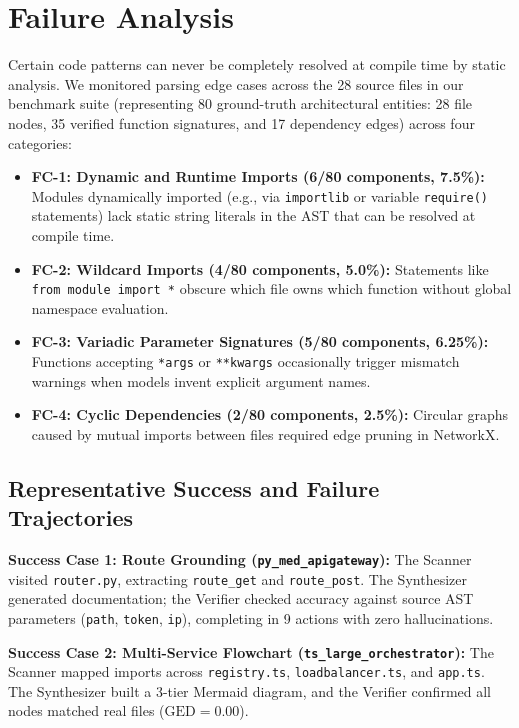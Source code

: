 \documentclass[conference]{IEEEtran}
\begin{document}
\section{Failure Analysis}
Certain code patterns can never be completely resolved at compile time by static analysis. We monitored parsing edge cases across the 28 source files in our benchmark suite (representing 80 ground-truth architectural entities: 28 file nodes, 35 verified function signatures, and 17 dependency edges) across four categories:
\begin{itemize}
    \item \textbf{FC-1: Dynamic and Runtime Imports (6/80 components, 7.5\%):} Modules dynamically imported (e.g., via \texttt{importlib} or variable \texttt{require()} statements) lack static string literals in the AST that can be resolved at compile time.
    \item \textbf{FC-2: Wildcard Imports (4/80 components, 5.0\%):} Statements like \texttt{from module import *} obscure which file owns which function without global namespace evaluation.
    \item \textbf{FC-3: Variadic Parameter Signatures (5/80 components, 6.25\%):} Functions accepting \texttt{*args} or \texttt{**kwargs} occasionally trigger mismatch warnings when models invent explicit argument names.
    \item \textbf{FC-4: Cyclic Dependencies (2/80 components, 2.5\%):} Circular graphs caused by mutual imports between files required edge pruning in NetworkX.
\end{itemize}

\subsection{Representative Success and Failure Trajectories}
\textbf{Success Case 1: Route Grounding (\texttt{py\_med\_apigateway}):}
The Scanner visited \texttt{router.py}, extracting \texttt{route\_get} and \texttt{route\_post}. The Synthesizer generated documentation; the Verifier checked accuracy against source AST parameters (\texttt{path}, \texttt{token}, \texttt{ip}), completing in 9 actions with zero hallucinations.

\textbf{Success Case 2: Multi-Service Flowchart (\texttt{ts\_large\_orchestrator}):}
The Scanner mapped imports across \texttt{registry.ts}, \texttt{loadbalancer.ts}, and \texttt{app.ts}. The Synthesizer built a 3-tier Mermaid diagram, and the Verifier confirmed all nodes matched real files ($\text{GED}=0.00$).
\end{document}
